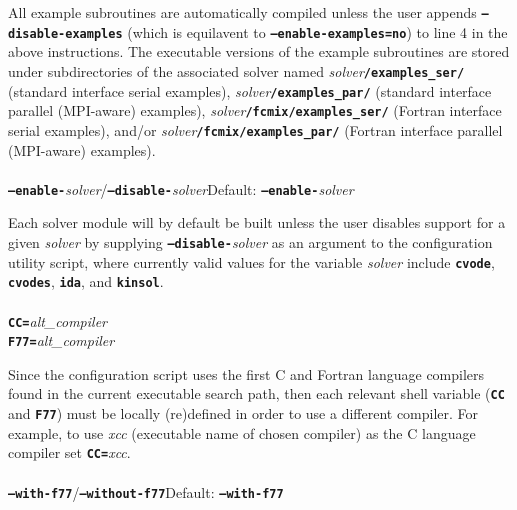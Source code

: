 All example subroutines are automatically compiled unless the user appends \texttt{\textbf{--disable-examples}} (which is equilavent to \texttt{\textbf{--enable-examples=no}}) to line \small 4 \normalsize in the above instructions.  The executable versions of the example subroutines are stored under subdirectories of the associated solver named \textit{solver}\texttt{\textbf{/examples\_\hspace{0.2ex}ser/}} (standard interface serial examples), \textit{solver}\texttt{\textbf{/examples\_\hspace{0.2ex}par/}} (standard interface parallel (\small MPI\normalsize-aware) examples), \textit{solver}\texttt{\textbf{/fcmix/examples\_\hspace{0.2ex}ser/}} (Fortran interface serial examples), and/or \textit{solver}\texttt{\textbf{/fcmix/examples\_\hspace{0.2ex}par/}} (Fortran interface parallel (\small MPI\normalsize-aware) examples).
\\
\\
\texttt{\textbf{--enable-}}\textit{solver}/\texttt{\textbf{--disable-}}\textit{solver}\hspace{0.5in}Default: \texttt{\textbf{--enable-}}\textit{solver}\vspace{0.05in}

Each solver module will by default be built unless the user disables support for a given \textit{solver} by supplying \texttt{\textbf{--disable-}}\textit{solver} as an argument to the configuration utility script, where currently valid values for the variable \textit{solver} include \texttt{\textbf{cvode}}, \texttt{\textbf{cvodes}}, \texttt{\textbf{ida}}, and \texttt{\textbf{kinsol}}.
\\
\\
\texttt{\textbf{CC=}}\textit{alt\_compiler}\\
\texttt{\textbf{F77=}}\textit{alt\_compiler}\vspace{0.05in}

Since the configuration script uses the first C and Fortran language compilers found in the current executable search path, then each relevant shell variable (\texttt{\textbf{\small CC\normalsize}} and \texttt{\textbf{\small F77\normalsize}}) must be locally (re)defined in order to use a different compiler.  For example, to use \textit{xcc} (executable name of chosen compiler) as the C language compiler set \texttt{\textbf{CC=}}\textit{xcc}.
\\
\\
\texttt{\textbf{--with-f77}}/\texttt{\textbf{--without-f77}}\hspace{0.5in}Default: \texttt{\textbf{--with-f77}}\vspace{0.05in}

